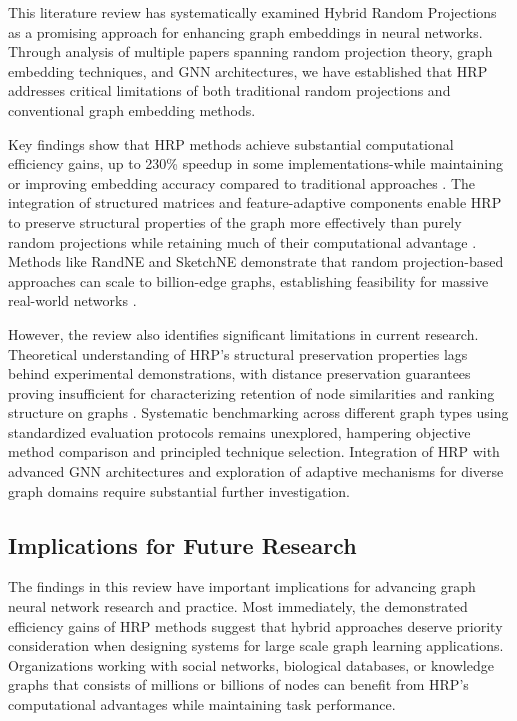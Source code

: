 \documentclass[conference]{IEEEtran}
\begin{document}
This literature review has systematically examined Hybrid Random Projections as a promising approach for enhancing graph embeddings in neural networks. Through analysis of multiple papers spanning random projection theory, graph embedding techniques, and GNN architectures, we have established that HRP addresses critical limitations of both traditional random projections and conventional graph embedding methods.

Key findings show that HRP methods achieve substantial computational efficiency gains, up to 230\% speedup in some implementations-while maintaining or improving embedding accuracy compared to traditional approaches \cite{hu2021rphgnn, bui2023rap}. The integration of structured matrices and feature-adaptive components enable HRP to preserve structural properties of the graph more effectively than purely random projections while retaining much of their computational advantage \cite{yahaya2025hrp, wang2019hierarchical}. Methods like RandNE and SketchNE demonstrate that random projection-based approaches can scale to billion-edge graphs, establishing feasibility for massive real-world networks \cite{zhang2018randne, xie2023sketchne}.

However, the review also identifies significant limitations in current research. Theoretical understanding of HRP's structural preservation properties lags behind experimental demonstrations, with distance preservation guarantees proving insufficient for characterizing retention of node similarities and ranking structure on graphs \cite{tadic2024}. Systematic benchmarking across different graph types using standardized evaluation protocols remains unexplored, hampering objective method comparison and principled technique selection. Integration of HRP with advanced GNN architectures and exploration of adaptive mechanisms for diverse graph domains require substantial further investigation.

\subsection{Implications for Future Research}

The findings in this review have important implications for advancing graph neural network research and practice. Most immediately, the demonstrated efficiency gains of HRP methods suggest that hybrid approaches deserve priority consideration when designing systems for large scale graph learning applications. Organizations working with social networks, biological databases, or knowledge graphs that consists of millions or billions of nodes can benefit from HRP's computational advantages while maintaining task performance.
\end{document}
